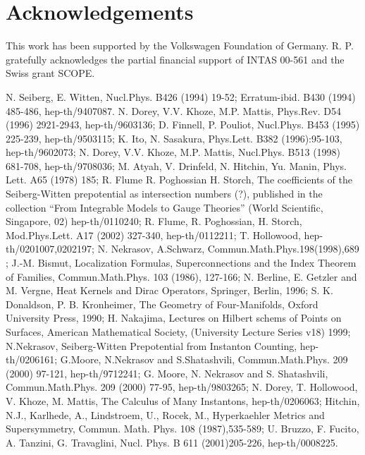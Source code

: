 \documentclass[a4paper,12pt]{article}
\begin{document}
\section{Acknowledgements}

This work has been supported by the Volkswagen Foundation of
Germany. R. P. gratefully acknowledges the partial financial
support of INTAS 00-561 and  the Swiss grant SCOPE.








\begin{thebibliography}{99}
N. Seiberg, E. Witten, Nucl.Phys. B426 (1994) 19-52;
Erratum-ibid. B430 (1994) 485-486, hep-th/9407087.
N. Dorey, V.V. Khoze, M.P. Mattis,
Phys.Rev. D54 (1996) 2921-2943, hep-th/9603136;
D. Finnell, P. Pouliot, Nucl.Phys. B453 (1995) 225-239,
hep-th/9503115;
K. Ito, N. Sasakura, Phys.Lett. B382 (1996):95-103,
hep-th/9602073;
N. Dorey, V.V. Khoze, M.P. Mattis,
Nucl.Phys. B513 (1998) 681-708, hep-th/9708036;
M. Atyah, V. Drinfeld, N. Hitchin, Yu. Manin,
Phys. Lett. A65 (1978) 185;
 R. Flume R. Poghossian H. Storch, The coefficients of
the Seiberg-Witten prepotential as intersection numbers (?),
published in the collection ``From Integrable Models to Gauge
Theories'' (World Scientific, Singapore, 02) hep-th/0110240;
 R. Flume, R. Poghossian, H. Storch,
Mod.Phys.Lett. A17 (2002) 327-340, hep-th/0112211;
T. Hollowood, hep-th/0201007,0202197;
N. Nekrasov, A.Schwarz, Commun.Math.Phys.198(1998),689 ;
 J.-M. Bismut, Localization Formulas, Superconnections
and the Index Theorem of Families, Commun.Math.Phys. 103 (1986), 127-166;
N. Berline, E. Getzler and M. Vergne,
Heat Kernels and Dirac Operators, Springer, Berlin, 1996;
S. K. Donaldson, P. B. Kronheimer, The Geometry of
Four-Manifolds, Oxford University Press, 1990;
H. Nakajima, Lectures on Hilbert schems of
Points on Surfaces, American Mathematical Society, (University Lecture Series v18) 1999;
 N.Nekrasov, Seiberg-Witten Prepotential from Instanton Counting, hep-th/0206161;
G.Moore, N.Nekrasov and S.Shatashvili, Commun.Math.Phys. 209 (2000) 97-121, hep-th/9712241;
G. Moore, N. Nekrasov and S. Shatashvili, Commun.Math.Phys. 209 (2000) 77-95, hep-th/9803265;
N. Dorey, T. Hollowood, V. Khoze, M. Mattis, The Calculus of Many Instantons,
hep-th/0206063;
Hitchin, N.J., Karlhede, A., Lindstroem, U., Rocek, M., Hyperkaehler Metrics
and Supersymmetry, Commun. Math. Phys. 108 (1987),535-589;
 U. Bruzzo, F. Fucito, A. Tanzini, G. Travaglini, Nucl. Phys. B 611 (2001)205-226, hep-th/0008225.
\end{thebibliography}
\end{document}
